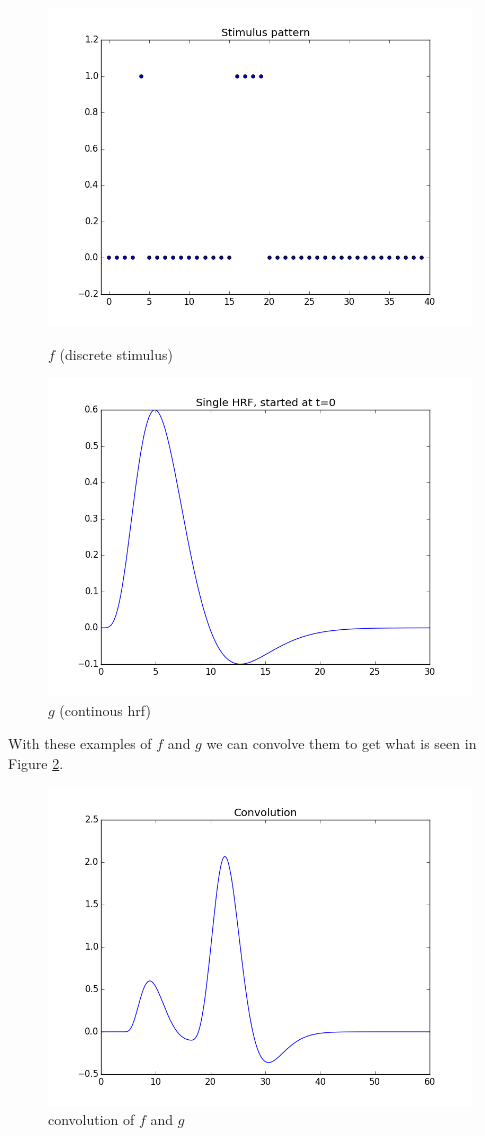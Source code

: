 \documentclass[11pt]{article}
\begin{document}
\begin{figure}[ht]
\centering
\begin{minipage}[b]{0.45\linewidth}
	\centering
	\includegraphics[width=.8\linewidth]{images/on_off_pattern.png} 
	\caption{$f$ (discrete stimulus)}
	\label{fig:on_off}
\end{minipage}	
\quad
\begin{minipage}[b]{0.45\linewidth}
	\centering
	\includegraphics[width=.8\linewidth]{images/hrf_pattern.png} 
	\caption{$g$ (continous hrf)}
	\label{fig:hrf}
\end{minipage}
\end{figure}

With these examples of  $f$ and $g$ we can convolve them to get what is seen in Figure \ref{fig:convolve1}.

\begin{figure}[ht]
	\centering
	\includegraphics[width=.5\linewidth]{images/initial_convolved.png}
	\caption{convolution of $f$ and $g$}
	\label{fig:convolve1}
\end{figure}
\end{document}

